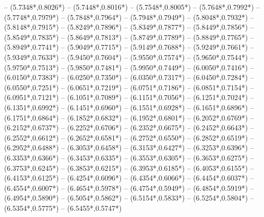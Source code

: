 {	-- ({5.7348*\dx},{0.8026*\dy})
	-- ({5.7448*\dx},{0.8016*\dy})
	-- ({5.7548*\dx},{0.8005*\dy})
	-- ({5.7648*\dx},{0.7992*\dy})
	-- ({5.7748*\dx},{0.7979*\dy})
	-- ({5.7848*\dx},{0.7964*\dy})
	-- ({5.7948*\dx},{0.7949*\dy})
	-- ({5.8048*\dx},{0.7932*\dy})
	-- ({5.8148*\dx},{0.7915*\dy})
	-- ({5.8249*\dx},{0.7896*\dy})
	-- ({5.8349*\dx},{0.7877*\dy})
	-- ({5.8449*\dx},{0.7856*\dy})
	-- ({5.8549*\dx},{0.7835*\dy})
	-- ({5.8649*\dx},{0.7813*\dy})
	-- ({5.8749*\dx},{0.7789*\dy})
	-- ({5.8849*\dx},{0.7765*\dy})
	-- ({5.8949*\dx},{0.7741*\dy})
	-- ({5.9049*\dx},{0.7715*\dy})
	-- ({5.9149*\dx},{0.7688*\dy})
	-- ({5.9249*\dx},{0.7661*\dy})
	-- ({5.9349*\dx},{0.7633*\dy})
	-- ({5.9450*\dx},{0.7604*\dy})
	-- ({5.9550*\dx},{0.7574*\dy})
	-- ({5.9650*\dx},{0.7544*\dy})
	-- ({5.9750*\dx},{0.7513*\dy})
	-- ({5.9850*\dx},{0.7481*\dy})
	-- ({5.9950*\dx},{0.7449*\dy})
	-- ({6.0050*\dx},{0.7416*\dy})
	-- ({6.0150*\dx},{0.7383*\dy})
	-- ({6.0250*\dx},{0.7350*\dy})
	-- ({6.0350*\dx},{0.7317*\dy})
	-- ({6.0450*\dx},{0.7284*\dy})
	-- ({6.0550*\dx},{0.7251*\dy})
	-- ({6.0651*\dx},{0.7219*\dy})
	-- ({6.0751*\dx},{0.7186*\dy})
	-- ({6.0851*\dx},{0.7154*\dy})
	-- ({6.0951*\dx},{0.7121*\dy})
	-- ({6.1051*\dx},{0.7089*\dy})
	-- ({6.1151*\dx},{0.7056*\dy})
	-- ({6.1251*\dx},{0.7024*\dy})
	-- ({6.1351*\dx},{0.6992*\dy})
	-- ({6.1451*\dx},{0.6960*\dy})
	-- ({6.1551*\dx},{0.6928*\dy})
	-- ({6.1651*\dx},{0.6896*\dy})
	-- ({6.1751*\dx},{0.6864*\dy})
	-- ({6.1852*\dx},{0.6832*\dy})
	-- ({6.1952*\dx},{0.6801*\dy})
	-- ({6.2052*\dx},{0.6769*\dy})
	-- ({6.2152*\dx},{0.6737*\dy})
	-- ({6.2252*\dx},{0.6706*\dy})
	-- ({6.2352*\dx},{0.6675*\dy})
	-- ({6.2452*\dx},{0.6643*\dy})
	-- ({6.2552*\dx},{0.6612*\dy})
	-- ({6.2652*\dx},{0.6581*\dy})
	-- ({6.2752*\dx},{0.6550*\dy})
	-- ({6.2852*\dx},{0.6519*\dy})
	-- ({6.2952*\dx},{0.6488*\dy})
	-- ({6.3053*\dx},{0.6458*\dy})
	-- ({6.3153*\dx},{0.6427*\dy})
	-- ({6.3253*\dx},{0.6396*\dy})
	-- ({6.3353*\dx},{0.6366*\dy})
	-- ({6.3453*\dx},{0.6335*\dy})
	-- ({6.3553*\dx},{0.6305*\dy})
	-- ({6.3653*\dx},{0.6275*\dy})
	-- ({6.3753*\dx},{0.6245*\dy})
	-- ({6.3853*\dx},{0.6215*\dy})
	-- ({6.3953*\dx},{0.6185*\dy})
	-- ({6.4053*\dx},{0.6155*\dy})
	-- ({6.4153*\dx},{0.6125*\dy})
	-- ({6.4254*\dx},{0.6096*\dy})
	-- ({6.4354*\dx},{0.6066*\dy})
	-- ({6.4454*\dx},{0.6037*\dy})
	-- ({6.4554*\dx},{0.6007*\dy})
	-- ({6.4654*\dx},{0.5978*\dy})
	-- ({6.4754*\dx},{0.5949*\dy})
	-- ({6.4854*\dx},{0.5919*\dy})
	-- ({6.4954*\dx},{0.5890*\dy})
	-- ({6.5054*\dx},{0.5862*\dy})
	-- ({6.5154*\dx},{0.5833*\dy})
	-- ({6.5254*\dx},{0.5804*\dy})
	-- ({6.5354*\dx},{0.5775*\dy})
	-- ({6.5455*\dx},{0.5747*\dy})
}
